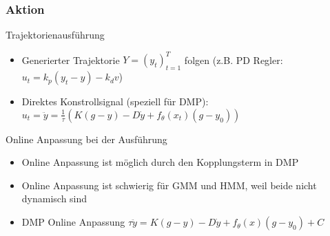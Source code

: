 \documentclass[paper=a4, fontsize=11pt]{scrartcl} %
\numberwithin{equation}{section} %
\numberwithin{figure}{section} %
\numberwithin{table}{section} %
\begin{document}
\subsubsection{Aktion}

Trajektorienausführung
\begin{itemize}
\item Generierter Trajektorie $Y = (y_t)^T_{t=1}$ folgen (z.B. PD Regler: $u_t = k_p (y_t - y) - k_d v$)
\item Direktes Konstrollsignal (speziell für DMP): $u_t = \ddot y = \frac{1}{\tau}(K(g-y) - D \dot y + f_\theta(x_t) (g-y_0))$
\end{itemize}

Online Anpassung bei der Ausführung
\begin{itemize}
\item Online Anpassung ist möglich durch den Kopplungsterm in DMP
\item Online Anpassung ist schwierig für GMM und HMM, weil beide nicht dynamisch sind
\item DMP Online Anpassung $\tau \ddot y = K(g-y) - D \dot y + f_\theta(x)(g-y_0)+C$
\end{itemize}
\end{document}
